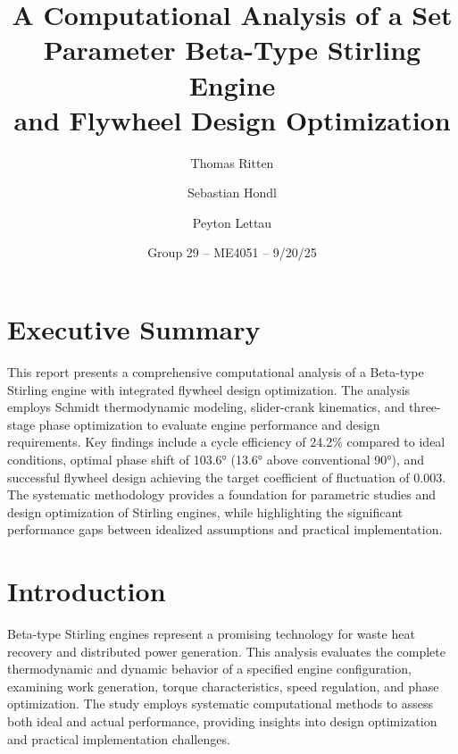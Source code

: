 \documentclass[12pt]{article}
\title{A Computational Analysis of a Set Parameter Beta-Type Stirling Engine\\and Flywheel Design Optimization}
\author{Thomas Ritten \and Sebastian Hondl \and Peyton Lettau}
\date{Group 29 -- ME4051 -- 9/20/25}
\begin{document}
\maketitle
\section*{Executive Summary}
This report presents a comprehensive computational analysis of a Beta-type Stirling engine with integrated flywheel design optimization. The analysis employs Schmidt thermodynamic modeling, slider-crank kinematics, and three-stage phase optimization to evaluate engine performance and design requirements. Key findings include a cycle efficiency of 24.2\% compared to ideal conditions, optimal phase shift of 103.6° (13.6° above conventional 90°), and successful flywheel design achieving the target coefficient of fluctuation of 0.003. The systematic methodology provides a foundation for parametric studies and design optimization of Stirling engines, while highlighting the significant performance gaps between idealized assumptions and practical implementation.

\section{Introduction}
Beta-type Stirling engines represent a promising technology for waste heat recovery and distributed power generation. This analysis evaluates the complete thermodynamic and dynamic behavior of a specified engine configuration, examining work generation, torque characteristics, speed regulation, and phase optimization. The study employs systematic computational methods to assess both ideal and actual performance, providing insights into design optimization and practical implementation challenges.
\end{document}
